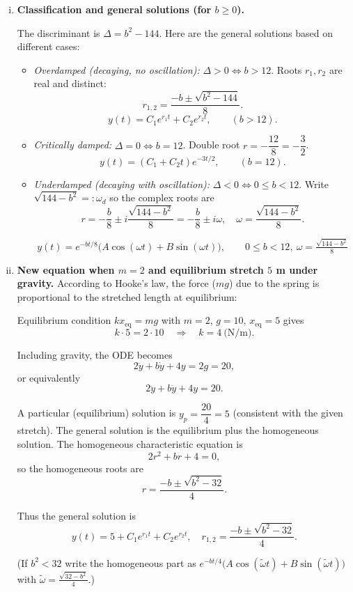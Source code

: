 \begin{example}
\begin{enumerate}[(i)]
    \item \textbf{Classification and general solutions (for \(b\ge0\)).}

    The discriminant is \(\Delta=b^{2}-144\). Here are the general solutions based on different cases:

    \begin{itemize}
      \item \emph{Overdamped (decaying, no oscillation):} \(\Delta>0\iff b>12\).  
      Roots \(r_{1},r_{2}\) are real and distinct:
      \[
      r_{1,2}=\frac{-b\pm\sqrt{b^{2}-144}}{8}.
      \]
      \[
      \boxed{\,y(t)=C_{1}e^{r_{1}t}+C_{2}e^{r_{2}t},\qquad (b>12).\,}
      \]

      \item \emph{Critically damped:} \(\Delta=0\iff b=12\).  
      Double root \(r=-\dfrac{12}{8}=-\dfrac{3}{2}\).
      \[
      \boxed{\,y(t)=(C_{1}+C_{2}t)e^{-3t/2},\qquad (b=12).\,}
      \]

      \item \emph{Underdamped (decaying with oscillation):} \(\Delta<0\iff 0\le b<12\).  
      Write \(\sqrt{144-b^{2}}=:\omega_d\) so the complex roots are
      \[
      r=-\frac{b}{8}\pm i\frac{\sqrt{144-b^{2}}}{8} = -\frac{b}{8}\pm i\omega,
      \quad \omega=\frac{\sqrt{144-b^{2}}}{8}.
      \]
      
      \[
      \boxed{\,y(t)=e^{-b t/8}\big( A\cos(\omega t)+B\sin(\omega t)\big),
      \qquad 0\le b<12,\ \omega=\tfrac{\sqrt{144-b^{2}}}{8} \,}
      \]
    \end{itemize}

    \medskip

    \item \textbf{New equation when \(m=2\) and equilibrium stretch \(5\) m under gravity.}
    According to Hooke's law, the force (\(mg\)) due to the spring is proportional to the stretched length at equilibrium:

    Equilibrium condition \(kx_{\text{eq}}=mg\) with \(m=2\), \(g=10\), \(x_{\text{eq}}=5\) gives
    \[
    k\cdot 5 = 2\cdot 10 \quad\Rightarrow\quad k=4\ \text{(N/m)}.
    \]

    Including gravity, the ODE becomes
    \[
    2\ddot y + b\dot y + 4y = 2g = 20,
    \]
    or equivalently
    \[
    2\ddot y + b\dot y + 4y = 20.
    \]

    A particular (equilibrium) solution is \(y_p=\dfrac{20}{4}=5\) (consistent with the given stretch). The general solution is the equilibrium plus the homogeneous solution. The homogeneous characteristic equation is
    \[
    2r^{2}+br+4=0,
    \]
    so the homogeneous roots are
    \[
    r=\frac{-b\pm\sqrt{b^{2}-32}}{4}.
    \]

    Thus the general solution is
    \[
    \boxed{\,y(t)=5 + C_1 e^{r_1 t} + C_2 e^{r_2 t},\quad
    r_{1,2}=\dfrac{-b\pm\sqrt{b^{2}-32}}{4}.\,}
    \]

    (If \(b^{2}<32\) write the homogeneous part as \(e^{-b t/4}\big(A\cos(\tilde\omega t)+B\sin(\tilde\omega t)\big)\) with \(\tilde\omega=\tfrac{\sqrt{32-b^{2}}}{4}\).)
\end{enumerate}

  \end{example}
